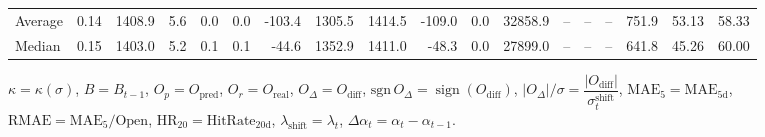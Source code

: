 \begin{threeparttable}
{\begin{tabular}{lrrrrrrrrrrrrrrrrr}
Average &     0.14 & 1408.9 &               5.6 &               0.0 &                0.0 &             -103.4 &  1305.5 & 1414.5 &     -109.0 &                      0.0 &             32858.9 &         -- &        -- &             -- &            751.9 &           53.13 &                  58.33 \\
 Median &     0.15 & 1403.0 &               5.2 &               0.1 &                0.1 &              -44.6 &  1352.9 & 1411.0 &      -48.3 &                      0.0 &             27899.0 &         -- &        -- &             -- &            641.8 &           45.26 &                  60.00 \\
\bottomrule
\end{tabular}
}
\begin{tablenotes}\footnotesize
\item $\kappa=\kappa(\sigma)$, $B=B_{t-1}$, $O_p=O_{\text{pred}}$, $O_r=O_{\text{real}}$, $O_\Delta=O_{\text{diff}}$, $\mathrm{sgn}\,O_\Delta=\operatorname{sign}(O_{\text{diff}})$, $|O_\Delta|/\sigma=\dfrac{|O_{\text{diff}}|}{\sigma_t^{\text{shift}}}$, $\mathrm{MAE}_5=\mathrm{MAE}_{5\text{d}}$, $\mathrm{RMAE}= \mathrm{MAE}_5 / \text{Open}$, $\mathrm{HR}_{20}=\mathrm{HitRate}_{20\text{d}}$, 
$\lambda_{\text{shift}}=\lambda_t$, 
$\Delta\alpha_t=\alpha_t-\alpha_{t-1}$.
\end{tablenotes}
\end{threeparttable}
\endgroup

